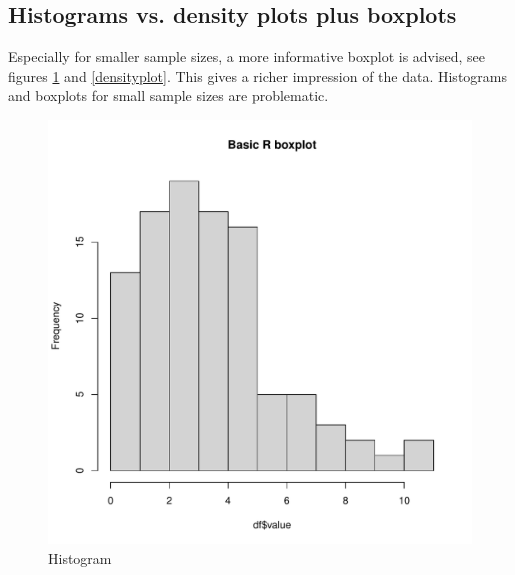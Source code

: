 \documentclass[12pt,a4paper]{article}
\begin{document}
\subsection{Histograms vs. density plots plus boxplots}
Especially for smaller sample sizes, a more informative boxplot is advised, see figures \ref{histogram} and \ref{densityplot}. This gives a richer impression of the data. Histograms and boxplots for small sample sizes are problematic.

\begin{figure}[htbp]
  \centering
  \begin{minipage}[b]{0.45\textwidth}
    \includegraphics[width=\textwidth]{./images/histogram.pdf}
    \caption{Histogram}
    \label{histogram}
  \end{minipage}
  \hfill  %
  \begin{minipage}[b]{0.45\textwidth}

\end{minipage}
\end{figure}
\end{document}
